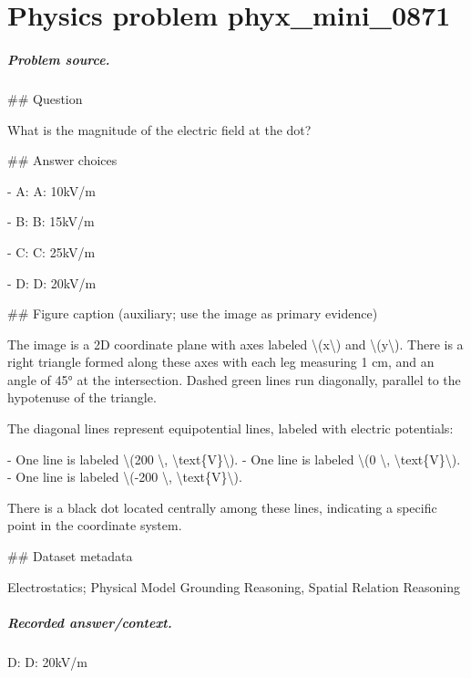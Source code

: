 
\chapter{Physics problem phyx\_mini\_0871}
\label{ch:PhyXMiniProblems_problem_phyx_mini_0871}

\paragraph{Problem source.}
\#\# Question

What is the magnitude of the electric field at the dot?

\#\# Answer choices

- A: A: 10kV/m

- B: B: 15kV/m

- C: C: 25kV/m

- D: D: 20kV/m

\#\# Figure caption (auxiliary; use the image as primary evidence)

The image is a 2D coordinate plane with axes labeled \textbackslash{}(x\textbackslash{}) and \textbackslash{}(y\textbackslash{}). There is a right triangle formed along these axes with each leg measuring 1 cm, and an angle of 45° at the intersection. Dashed green lines run diagonally, parallel to the hypotenuse of the triangle.

The diagonal lines represent equipotential lines, labeled with electric potentials:

- One line is labeled \textbackslash{}(200 \textbackslash{}, \textbackslash{}text\{V\}\textbackslash{}).
- One line is labeled \textbackslash{}(0 \textbackslash{}, \textbackslash{}text\{V\}\textbackslash{}).
- One line is labeled \textbackslash{}(-200 \textbackslash{}, \textbackslash{}text\{V\}\textbackslash{}).

There is a black dot located centrally among these lines, indicating a specific point in the coordinate system.

\#\# Dataset metadata

Electrostatics; Physical Model Grounding Reasoning, Spatial Relation Reasoning

\paragraph{Recorded answer/context.}
D: D: 20kV/m

